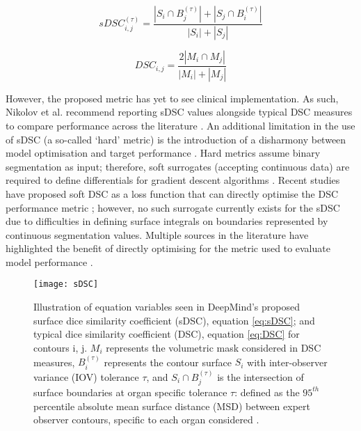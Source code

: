 \begin{equation}
sDSC_{i,j}^{(\tau)} = \frac{|S_{i} \cap B_{j}^{(\tau)}| + |S_{j} \cap B_{i}^{(\tau)}|}{|S_{i}| + |S_{j}|}
\label{eq:sDSC}
\end{equation}

\begin{equation}
DSC_{i,j} = \frac{2|M_{i} \cap M_{j}|}{|M_{i}| + |M_{j}|}
\label{eq:DSC}
\end{equation}

However, the proposed metric has yet to see clinical implementation. As such, Nikolov et al. recommend reporting sDSC values alongside typical DSC measures to compare performance across the literature \cite{Nikolov_2018}. An additional limitation in the use of sDSC (a so-called `hard' metric) is the introduction of a disharmony between model optimisation and target performance \cite{Bertels2019}. Hard metrics assume binary segmentation as input; therefore, soft surrogates (accepting continuous data) are required to define differentials for gradient descent algorithms \cite{Bertels2019}. Recent studies have proposed soft DSC as a loss function that can directly optimise the DSC performance metric \cite{Bertels2019}; however, no such surrogate currently exists for the sDSC due to difficulties in defining surface integrals on boundaries represented by continuous segmentation values. Multiple sources in the literature have highlighted the benefit of directly optimising for the metric used to evaluate model performance \cite{Bertels2019, Vapnik2000}.

\begin{figure}
	\begin{center}
		\texttt{[image: sDSC]}
		\caption{Illustration of equation variables seen in DeepMind's proposed surface dice similarity coefficient (sDSC), equation \ref{eq:sDSC}; and typical dice similarity coefficient (DSC), equation \ref{eq:DSC} for contours i, j. $M_{i}$ represents the volumetric mask considered in DSC measures, $B_{i}^{(\tau)}$ represents the contour surface $S_{i}$ with inter-observer variance (IOV) tolerance $\tau$, and $S_{i} \cap B_{j}^{(\tau)}$ is the intersection of surface boundaries at organ specific tolerance $\tau$: defined as the $95^{th}$ percentile absolute mean surface distance (MSD) between expert observer contours, specific to each organ considered \cite{Nikolov_2018}.}
		\label{fig:sDSC}
	\end{center}
\end{figure}

